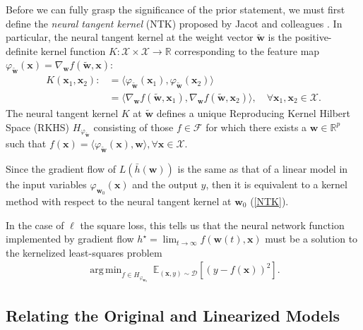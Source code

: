 \documentclass{article}
\DeclareMathOperator*{\argmin}{arg\,min}
\begin{document}
Before we can fully grasp the significance of the prior statement, we must first define the \textit{neural tangent kernel} (NTK) proposed by Jacot and colleagues \cite{jacot2018neural}. In particular, the neural tangent kernel at the weight vector $\boldsymbol{\tilde{w}}$ is the positive-definite kernel function $K: \mathcal{X} \times \mathcal{X} \rightarrow \mathbb{R}$ corresponding to the feature map $\varphi_{\boldsymbol{\tilde{w}}}(\boldsymbol{x}) = \nabla_{\boldsymbol{w}} f(\boldsymbol{\tilde{w}}, \boldsymbol{x})$:
\begin{align}
    K(\boldsymbol{x}_1, \boldsymbol{x}_2) :&= \langle \varphi_{\boldsymbol{\tilde{w}}}(\boldsymbol{x}_1), \varphi_{\boldsymbol{\tilde{w}}}(\boldsymbol{x}_2) \rangle \nonumber \\
    &= \langle \nabla_{\boldsymbol{w}} f(\boldsymbol{\tilde{w}}, \boldsymbol{x}_1), \nabla_{\boldsymbol{w}} f(\boldsymbol{\tilde{w}}, \boldsymbol{x}_2) \rangle, \quad \forall \boldsymbol{x}_1, \boldsymbol{x}_2 \in \mathcal{X}\label{NTK}.
\end{align}
The neural tangent kernel $K$ at $\boldsymbol{\tilde{w}}$ defines a unique Reproducing Kernel Hilbert Space (RKHS) $H_{\varphi_{\boldsymbol{\tilde{w}}}}$ consisting of those $f \in \mathcal{F}$ for which there exists a $\boldsymbol{w} \in \mathbb{R}^p$ such that $f(\boldsymbol{x}) = \langle \varphi_{\boldsymbol{\tilde{w}}}(\boldsymbol{x}), \boldsymbol{w} \rangle, \forall \boldsymbol{x} \in \mathcal{X}$.  

Since the gradient flow of $L(\bar{h}(\boldsymbol{w}))$ is the same as that of a linear model in the input variables $\varphi_{\boldsymbol{w}_0}(\boldsymbol{x})$ and the output $y$, then it is equivalent to a kernel method with respect to the neural tangent kernel at $\boldsymbol{w}_0$ (\ref{NTK}). 

In the case of $\ell$ the square loss, this tells us that the neural network function implemented by gradient flow $h^{\star} = \lim_{t \to \infty} f(\boldsymbol{w}(t), \boldsymbol{x})$ must be a solution to the kernelized least-squares problem
\begin{align*}
   \argmin_{f \in H_{\varphi_{\boldsymbol{w}_0}}} \ \mathbb{E}_{(\boldsymbol{x}, y) \sim \mathcal{D}}\left[(y - f(\boldsymbol{x}))^2 \right].
\end{align*}

\subsection{Relating the Original and Linearized Models}\label{kerneltheory}
\end{document}
